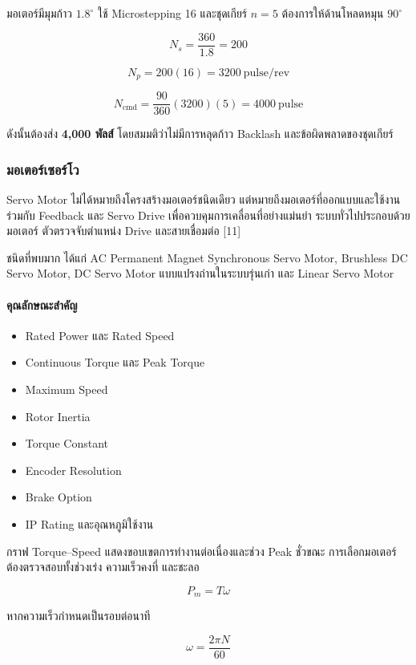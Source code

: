 มอเตอร์มีมุมก้าว $1.8^\circ$ ใช้ Microstepping 16 และชุดเกียร์ $n=5$ ต้องการให้ด้านโหลดหมุน $90^\circ$

\[
N_s=\frac{360}{1.8}=200
\]

\[
N_p=200(16)=3200\ \text{pulse/rev}
\]

\[
N_{\text{cmd}}
=
\frac{90}{360}(3200)(5)
=
4000\ \text{pulse}
\]

ดังนั้นต้องส่ง \textbf{4,000 พัลส์} โดยสมมติว่าไม่มีการหลุดก้าว Backlash และข้อผิดพลาดของชุดเกียร์

\subsubsection{มอเตอร์เซอร์โว}

Servo Motor ไม่ได้หมายถึงโครงสร้างมอเตอร์ชนิดเดียว แต่หมายถึงมอเตอร์ที่ออกแบบและใช้งานร่วมกับ Feedback และ Servo Drive เพื่อควบคุมการเคลื่อนที่อย่างแม่นยำ ระบบทั่วไปประกอบด้วยมอเตอร์ ตัวตรวจจับตำแหน่ง Drive และสายเชื่อมต่อ [11]

ชนิดที่พบมาก ได้แก่ AC Permanent Magnet Synchronous Servo Motor, Brushless DC Servo Motor, DC Servo Motor แบบแปรงถ่านในระบบรุ่นเก่า และ Linear Servo Motor

\paragraph{คุณลักษณะสำคัญ}

\begin{itemize}
    \item Rated Power และ Rated Speed
    \item Continuous Torque และ Peak Torque
    \item Maximum Speed
    \item Rotor Inertia
    \item Torque Constant
    \item Encoder Resolution
    \item Brake Option
    \item IP Rating และอุณหภูมิใช้งาน
\end{itemize}

กราฟ Torque–Speed แสดงขอบเขตการทำงานต่อเนื่องและช่วง Peak ชั่วขณะ การเลือกมอเตอร์ต้องตรวจสอบทั้งช่วงเร่ง ความเร็วคงที่ และชะลอ

\[
P_m=T\omega
\]

หากความเร็วกำหนดเป็นรอบต่อนาที

\[
\omega=\frac{2\pi N}{60}
\]

